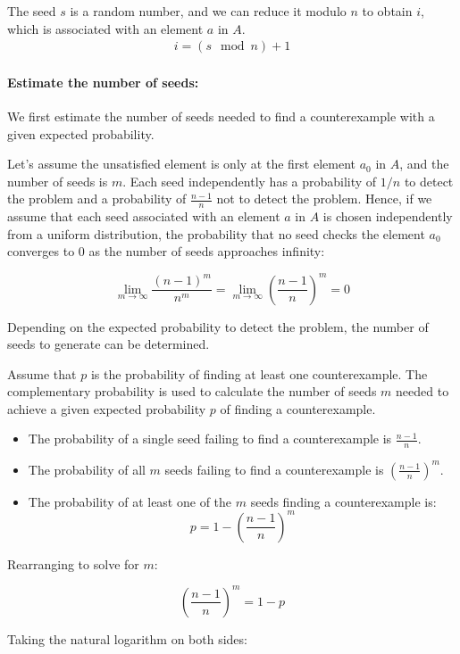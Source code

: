 \documentclass[runningheads]{llncs}
\begin{document}
The seed \( s \) is a random number, and we can reduce it modulo \( n \) to obtain \( i \), which is associated with an element \( a \) in \( A \).
\begin{align}
i = (s \mod n) + 1
\end{align}

\paragraph{Estimate the number of seeds:} We first estimate the number of seeds needed to find a counterexample with a given expected probability. %

Let's assume the unsatisfied element is only at the first element $a_0$ in $A$, and the number of seeds is $m$. Each seed independently has a probability of $1/n$ to detect the problem and a probability of $\frac{n-1}{n}$ not to detect the problem. Hence, if we assume that each seed associated with an element $a$ in $A$ is chosen independently from a uniform distribution, the probability that no seed checks the element $a_0$ converges to $0$ as the number of seeds approaches infinity:

\[
  \lim_{m \to \infty} \frac{(n-1)^m}{n^m} = \lim_{m \to \infty} \left( \frac{n-1}{n} \right)^m = 0
\]

Depending on the expected probability to detect the problem, the number of seeds to generate can be determined. 

Assume that $p$ is the probability of finding at least one counterexample. The complementary probability is used to calculate the number of seeds $m$ needed to achieve a given expected probability $p$ of finding a counterexample.
\begin{itemize}
\item The probability of a single seed failing to find a counterexample is $\frac{n-1}{n}$.
\item The probability of all $m$ seeds failing to find a counterexample is $\left(\frac{n-1}{n}\right)^m$.
\item The probability of at least one of the $m$ seeds finding a counterexample is:
\[
p = 1 - \left(\frac{n-1}{n}\right)^m
\]
\end{itemize}  

Rearranging to solve for \( m \):

\[
\left(\frac{n-1}{n}\right)^m = 1 - p
\]

Taking the natural logarithm on both sides:
\end{document}
